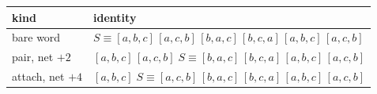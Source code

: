 \documentclass[11pt]{article}
\begin{document}
\begin{center}\small
\begin{tabular}{ll}
\toprule
kind & identity \\
\midrule
bare word & $S \equiv [a,b,c]\,[a,c,b]\,[b,a,c]\,[b,c,a]\,[a,b,c]\,[a,c,b]$ \\
pair, net $+2$ & $[a,b,c]\,[a,c,b]\;S \equiv [b,a,c]\,[b,c,a]\,[a,b,c]\,[a,c,b]$ \\
attach, net $+4$ & $[a,b,c]\;S \equiv [a,c,b]\,[b,a,c]\,[b,c,a]\,[a,b,c]\,[a,c,b]$ \\
\bottomrule
\end{tabular}
\end{center}
\end{document}
